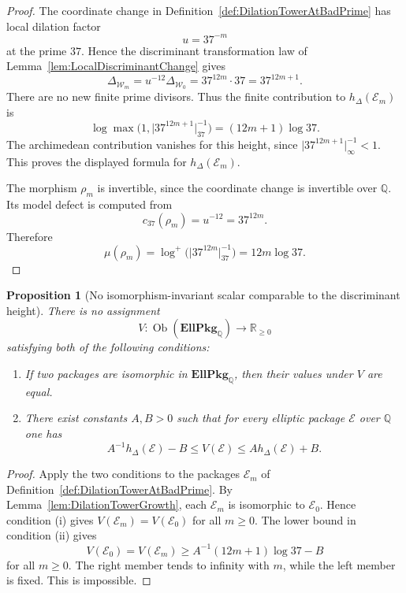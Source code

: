 \documentclass[10pt, reqno]{amsart}
\theoremstyle{plain}
\newtheorem{proposition}[theorem]{Proposition}
\theoremstyle{definition}
\theoremstyle{plain}
\newcommand{\Q}{\mathbb{Q}}
\newcommand{\R}{\mathbb{R}}
\begin{document}
\begin{proof}
The coordinate change in Definition~\ref{def:DilationTowerAtBadPrime} has local dilation factor
\[
  u=37^{-m}
\]
at the prime $37$. Hence the discriminant transformation law of Lemma~\ref{lem:LocalDiscriminantChange} gives
\[
  \Delta_{\mathcal{W}_m}=u^{-12}\Delta_{\mathcal{W}_0}
  =
  37^{12m}\cdot 37
  =
  37^{12m+1}.
\]
There are no new finite prime divisors. Thus the finite contribution to $h_\Delta(\mathcal{E}_m)$ is
\[
  \log\max\bigl(1,\lvert 37^{12m+1}\rvert_{37}^{-1}\bigr)
  =
  (12m+1)\log 37.
\]
The archimedean contribution vanishes for this height, since $\lvert 37^{12m+1}\rvert_\infty^{-1}<1$. This proves the displayed formula for $h_\Delta(\mathcal{E}_m)$.

The morphism $\rho_m$ is invertible, since the coordinate change is invertible over $\Q$. Its model defect is computed from
\[
  c_{37}(\rho_m)=u^{-12}=37^{12m}.
\]
Therefore
\[
  \mu(\rho_m)
  =
  \log^{+}\bigl(\lvert 37^{12m}\rvert_{37}^{-1}\bigr)
  =
  12m\log 37.
\]
\end{proof}

\begin{proposition}[No isomorphism-invariant scalar comparable to the discriminant height]
\label{prop:NoInvariantLogVolume}
There is no assignment
\[
  V \colon \operatorname{Ob}(\mathbf{EllPkg}_{\Q})\longrightarrow \R_{\ge 0}
\]
satisfying both of the following conditions:
\begin{enumerate}
\item[\textup{(i)}] If two packages are isomorphic in $\mathbf{EllPkg}_{\Q}$, then their values under $V$ are equal.
\item[\textup{(ii)}] There exist constants $A,B>0$ such that for every elliptic package $\mathcal{E}$ over $\Q$ one has
\[
  A^{-1}h_\Delta(\mathcal{E})-B
  \le
  V(\mathcal{E})
  \le
  Ah_\Delta(\mathcal{E})+B.
\]
\end{enumerate}
\end{proposition}

\begin{proof}
Apply the two conditions to the packages $\mathcal{E}_m$ of Definition~\ref{def:DilationTowerAtBadPrime}. By Lemma~\ref{lem:DilationTowerGrowth}, each $\mathcal{E}_m$ is isomorphic to $\mathcal{E}_0$. Hence condition \textup{(i)} gives $V(\mathcal{E}_m)=V(\mathcal{E}_0)$ for all $m\ge 0$. The lower bound in condition \textup{(ii)} gives
\[
  V(\mathcal{E}_0)
  =
  V(\mathcal{E}_m)
  \ge
  A^{-1}(12m+1)\log 37-B
\]
for all $m\ge 0$. The right member tends to infinity with $m$, while the left member is fixed. This is impossible.
\end{proof}
\end{document}
